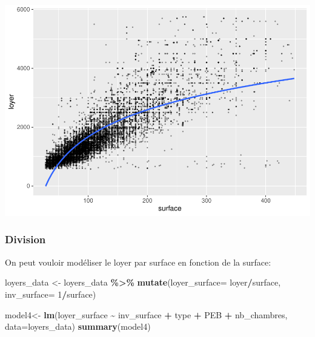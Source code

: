 \documentclass[
]{book}
\newenvironment{Shaded}{\begin{snugshade}}{\end{snugshade}}
\newcommand{\AttributeTok}[1]{\textcolor[rgb]{0.13,0.29,0.53}{#1}}
\newcommand{\DecValTok}[1]{\textcolor[rgb]{0.00,0.00,0.81}{#1}}
\newcommand{\FunctionTok}[1]{\textcolor[rgb]{0.13,0.29,0.53}{\textbf{#1}}}
\newcommand{\NormalTok}[1]{#1}
\newcommand{\OtherTok}[1]{\textcolor[rgb]{0.56,0.35,0.01}{#1}}
\newcommand{\SpecialCharTok}[1]{\textcolor[rgb]{0.81,0.36,0.00}{\textbf{#1}}}
\begin{document}
\includegraphics{bookdown-demo_files/figure-latex/unnamed-chunk-13-1.pdf}

\hypertarget{division}{%
\subsubsection{Division}\label{division}}

On peut vouloir modéliser le loyer par surface en fonction de la
surface:

\begin{Shaded}
\begin{Highlighting}[]
\NormalTok{loyers\_data }\OtherTok{\textless{}{-}}\NormalTok{ loyers\_data }\SpecialCharTok{\%\textgreater{}\%}
  \FunctionTok{mutate}\NormalTok{(}\AttributeTok{loyer\_surface=}\NormalTok{ loyer}\SpecialCharTok{/}\NormalTok{surface,}
         \AttributeTok{inv\_surface=} \DecValTok{1}\SpecialCharTok{/}\NormalTok{surface)}

\NormalTok{model4}\OtherTok{\textless{}{-}} \FunctionTok{lm}\NormalTok{(loyer\_surface }\SpecialCharTok{\textasciitilde{}}\NormalTok{ inv\_surface }\SpecialCharTok{+}\NormalTok{  type }\SpecialCharTok{+}\NormalTok{ PEB }\SpecialCharTok{+}\NormalTok{ nb\_chambres, }\AttributeTok{data=}\NormalTok{loyers\_data)}
\FunctionTok{summary}\NormalTok{(model4)}
\end{Highlighting}
\end{Shaded}
\end{document}
